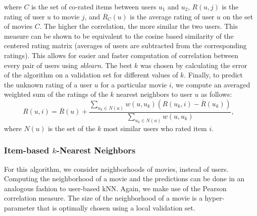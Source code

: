 \documentclass[10pt,conference,compsocconf]{IEEEtran}
\begin{document}
	where $C$ is the set of co-rated items between users $u_1$ and $u_2$, $R(u,j)$ is the rating of user $u$ to movie $j$, and $\overline{R}_C(u)$ is the average rating of user $u$ on the set of movies $C$. The higher the correlation, the more similar the two users. This measure can be shown \cite{L10} to be equivalent to the cosine based similarity of the centered rating matrix (averages of users are subtracted from the corresponding ratings). This allows for easier and faster computation of correlation between every pair of users using \emph{sklearn}. The best $k$ was chosen by calculating the error of the algorithm on a validation set for different values of $k$. Finally, to predict the unknown rating of a user $u$ for a particular movie $i$, we compute an averaged weighted sum of the ratings of the $k$ nearest neighbors to user $u$ as follows:
	\begin{equation} \label{eqn:predict_user_based}
	R(u,i) = \overline{R}(u) + \frac{\sum_{u_k \in N(u)} w(u,u_k)(R(u_k,i) - \overline{R}(u_k))}{\sum_{u_k \in N(u)} w(u,u_k)},
	\end{equation}
	where $N(u)$ is the set of the $k$ most similar users who rated item $i$.
	\\
	
	\subsubsection*{\textbf{Item-based $k$-Nearest Neighbors}}  For this algorithm, we consider neighborhoods of movies, instead of users. Computing the neighborhood of a movie and the predictions can be done in an analogous fashion to user-based kNN. Again, we make use of the Pearson correlation measure. The size of the neighborhood of a movie is a hyper-parameter that is optimally chosen using a local validation set.
	
	
\end{document}
